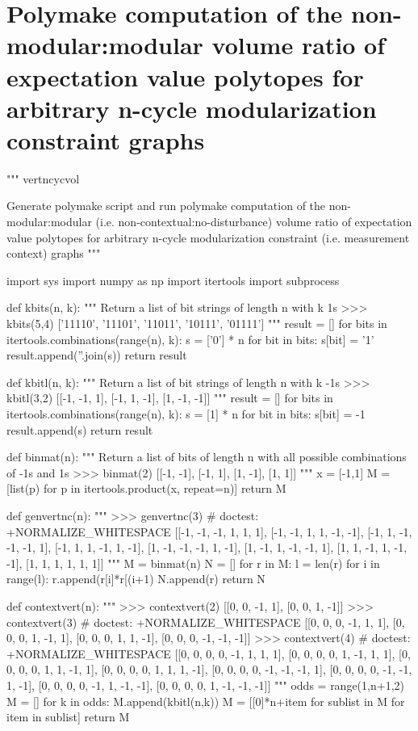 \section*{Polymake computation of the non-modular:modular volume ratio of expectation value polytopes for arbitrary n-cycle modularization constraint graphs}
\begin{python}
"""
vertncycvol

Generate polymake script and run polymake computation of the
non-modular:modular (i.e. non-contextual:no-disturbance) volume ratio
of expectation value polytopes for arbitrary n-cycle modularization
constraint (i.e. measurement context) graphs
"""

import sys
import numpy as np
import itertools
import subprocess

def kbits(n, k):
    """
    Return a list of bit strings of length n with k 1s
    >>> kbits(5,4)
    ['11110', '11101', '11011', '10111', '01111']
    """
    result = []
    for bits in itertools.combinations(range(n), k):
        s = ['0'] * n
        for bit in bits:
            s[bit] = '1'
        result.append(''.join(s))
    return result

def kbitl(n, k):
    """
    Return a list of bit strings of length n with k -1s
    >>> kbitl(3,2)
    [[-1, -1, 1], [-1, 1, -1], [1, -1, -1]]
    """
    result = []
    for bits in itertools.combinations(range(n), k):
        s = [1] * n
        for bit in bits:
            s[bit] = -1
        result.append(s)
    return result

def binmat(n):
    """
    Return a list of bits of length n with all possible
    combinations of -1s and 1s
    >>> binmat(2)
    [[-1, -1], [-1, 1], [1, -1], [1, 1]]
    """
    x = [-1,1]
    M = [list(p) for p in itertools.product(x, repeat=n)]
    return M

def genvertnc(n):
    """
    >>> genvertnc(3) # doctest: +NORMALIZE_WHITESPACE
    [[-1, -1, -1, 1, 1, 1], [-1, -1, 1, 1, -1, -1],
    [-1, 1, -1, -1, -1, 1], [-1, 1, 1, -1, 1, -1],
    [1, -1, -1, -1, 1, -1], [1, -1, 1, -1, -1, 1],
    [1, 1, -1, 1, -1, -1], [1, 1, 1, 1, 1, 1]]
    """
    M = binmat(n)
    N = []
    for r in M:
        l = len(r)
        for i in range(l):
            r.append(r[i]*r[(i+1) %
        N.append(r)
    return N

def contextvert(n):
    """
    >>> contextvert(2)
    [[0, 0, -1, 1], [0, 0, 1, -1]]
    >>> contextvert(3) # doctest: +NORMALIZE_WHITESPACE
    [[0, 0, 0, -1, 1, 1], [0, 0, 0, 1, -1, 1],
    [0, 0, 0, 1, 1, -1], [0, 0, 0, -1, -1, -1]]
    >>> contextvert(4) # doctest: +NORMALIZE_WHITESPACE
    [[0, 0, 0, 0, -1, 1, 1, 1], [0, 0, 0, 0, 1, -1, 1, 1],
    [0, 0, 0, 0, 1, 1, -1, 1], [0, 0, 0, 0, 1, 1, 1, -1],
    [0, 0, 0, 0, -1, -1, -1, 1], [0, 0, 0, 0, -1, -1, 1, -1],
    [0, 0, 0, 0, -1, 1, -1, -1], [0, 0, 0, 0, 1, -1, -1, -1]]
    """
    odds = range(1,n+1,2)
    M = []
    for k in odds:
        M.append(kbitl(n,k))
    M = [[0]*n+item for sublist in M for item in sublist]
    return M


\end{python}

